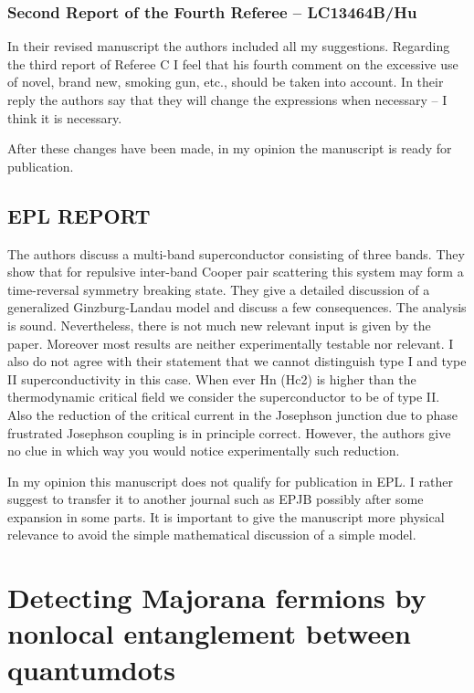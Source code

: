 \documentclass[11pt]{article}
\begin{document}
\hypertarget{second-report-of-the-fourth-referee-lc13464bhu}{%
\subsubsection{Second Report of the Fourth Referee --
LC13464B/Hu}\label{second-report-of-the-fourth-referee-lc13464bhu}}

In their revised manuscript the authors included all my suggestions.
Regarding the third report of Referee C I feel that his fourth comment
on the excessive use of novel, brand new, smoking gun, etc., should be
taken into account. In their reply the authors say that they will change
the expressions when necessary -- I think it is necessary.

After these changes have been made, in my opinion the manuscript is
ready for publication.

\hypertarget{epl-report}{%
\subsection{EPL REPORT}\label{epl-report}}

The authors discuss a multi-band superconductor consisting of three
bands. They show that for repulsive inter-band Cooper pair scattering
this system may form a time-reversal symmetry breaking state. They give
a detailed discussion of a generalized Ginzburg-Landau model and discuss
a few consequences. The analysis is sound. Nevertheless, there is not
much new relevant input is given by the paper. Moreover most results are
neither experimentally testable nor relevant. I also do not agree with
their statement that we cannot distinguish type I and type II
superconductivity in this case. When ever Hn (Hc2) is higher than the
thermodynamic critical field we consider the superconductor to be of
type II. Also the reduction of the critical current in the Josephson
junction due to phase frustrated Josephson coupling is in principle
correct. However, the authors give no clue in which way you would notice
experimentally such reduction.

In my opinion this manuscript does not qualify for publication in EPL. I
rather suggest to transfer it to another journal such as EPJB possibly
after some expansion in some parts. It is important to give the
manuscript more physical relevance to avoid the simple mathematical
discussion of a simple model.

    \hypertarget{detecting-majorana-fermions-by-nonlocal-entanglement-between-quantumdots}{%
\section{Detecting Majorana fermions by nonlocal entanglement between
quantumdots}\label{detecting-majorana-fermions-by-nonlocal-entanglement-between-quantumdots}}
\end{document}
